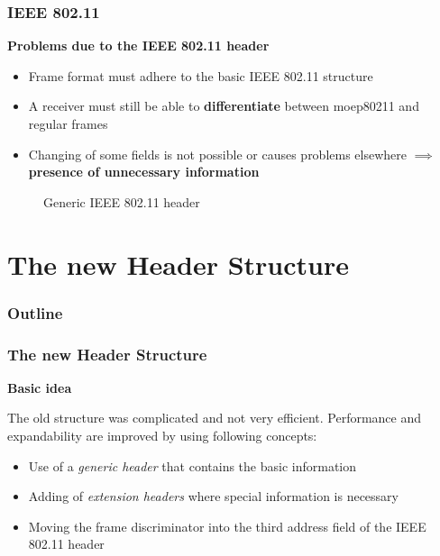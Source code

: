 \documentclass[t]{beamer}
\begin{document}
\begin{frame}
    \frametitle{IEEE 802.11}
    \textbf{Problems due to the IEEE 802.11 header}

	\begin{itemize}
        \item<1-> Frame format must adhere to the basic IEEE 802.11 structure
		\item<2-> A receiver must still be able to \textbf{differentiate} between moep80211 and regular frames
        \item<3-> Changing of some fields is not possible or causes problems elsewhere $\implies $ \textbf{presence of unnecessary information}
    \end{itemize}


    \begin{figure}
		\centering
		
		\caption{Generic IEEE 802.11 header}
	\end{figure}

\end{frame}



\section{The new Header Structure}

\begin{frame}
    \frametitle{Outline}
    \tableofcontents[currentsection]
\end{frame}

\begin{frame}
    \frametitle{The new Header Structure}
    \textbf{Basic idea}
    
   The old structure was complicated and not very efficient. Performance and expandability are improved by using following concepts: \pause
    
    \begin{itemize}
        \item Use of a \emph{generic header} that contains the basic information \pause
        \item Adding of \emph{extension headers} where special information is necessary \pause
        \item Moving the frame discriminator into the third address field of the IEEE 802.11 header
    \end{itemize}

\end{frame}
\end{document}
